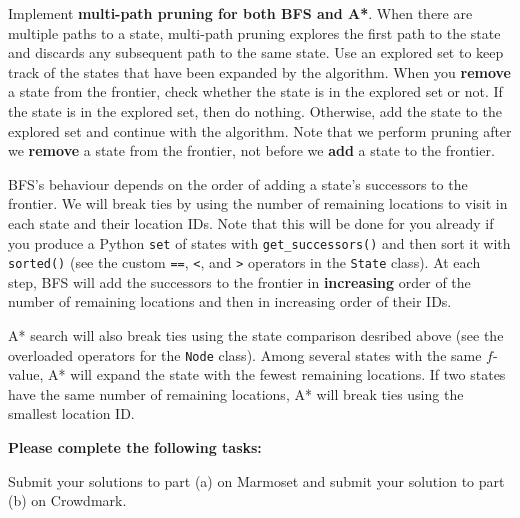 \documentclass[12pt]{article}
\begin{document}
Implement {\bf multi-path pruning for both BFS and A*}. When there are multiple paths to a state, multi-path pruning explores the first path to the state and discards any subsequent path to the same state. Use an explored set to keep track of the states that have been expanded by the algorithm. When you {\bf remove} a state from the frontier, check whether the state is in the explored set or not. If the state is in the explored set, then do nothing. Otherwise, add the state to the explored set and continue with the algorithm. Note that we perform pruning after we {\bf remove} a state from the frontier, not before we {\bf add} a state to the frontier.

BFS's behaviour depends on the order of adding a state's successors to the frontier. We will break ties by using the number of remaining locations to visit in each state and their location IDs. Note that this will be done for you already if you produce a Python \verb+set+ of states with \verb+get_successors()+ and then sort it with \verb+sorted()+ (see the custom \verb+==+, \verb+<+, and \verb+>+ operators in the \verb+State+ class). At each step, BFS will add the successors to the frontier in {\bf increasing} order of the number of remaining locations and then in increasing order of their IDs.

A* search will also break ties using the state comparison desribed above (see the overloaded operators for the \verb+Node+ class). Among several states with the same $f$-value, A* will expand the state with the fewest remaining locations. If two states have the same number of remaining locations, A* will break ties using the smallest location ID.

{\bf Please complete the following tasks:}

Submit your solutions to part (a) on Marmoset and submit your solution to part (b) on Crowdmark.
\end{document}
